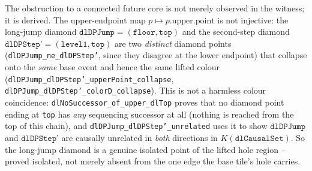 \begin{theorem}\label{thm:diamond-lift-collapse}\leanok{}
The obstruction to a connected future core is not merely observed in the witness; it is derived.
The upper-endpoint map $p \mapsto p.\text{upper}.\text{point}$ is not injective: the long-jump
diamond $\texttt{dlDPJump} = (\texttt{floor},\texttt{top})$ and the second-step diamond
$\texttt{dlDPStep'} = (\texttt{level1},\texttt{top})$ are two \emph{distinct} diamond points
(\texttt{dlDPJump\_ne\_dlDPStep'}, since they disagree at the lower endpoint) that collapse onto
the \emph{same} base event and hence the same lifted colour
(\texttt{dlDPJump\_dlDPStep'\_upperPoint\_collapse}, \texttt{dlDPJump\_dlDPStep'\_colorD\_collapse}).
This is not a harmless colour coincidence: \texttt{dlNoSuccessor\_of\_upper\_dlTop} proves that no
diamond point ending at \texttt{top} has \emph{any} sequencing successor at all (nothing is reached
from the top of this chain), and \texttt{dlDPJump\_dlDPStep'\_unrelated} uses it to show
$\texttt{dlDPJump}$ and $\texttt{dlDPStep'}$ are causally unrelated in \emph{both} directions in
$K(\texttt{dlCausalSet})$. So the long-jump diamond is a genuine isolated point of the lifted hole
region -- proved isolated, not merely absent from the one edge the base tile's hole carries.
\end{theorem}

